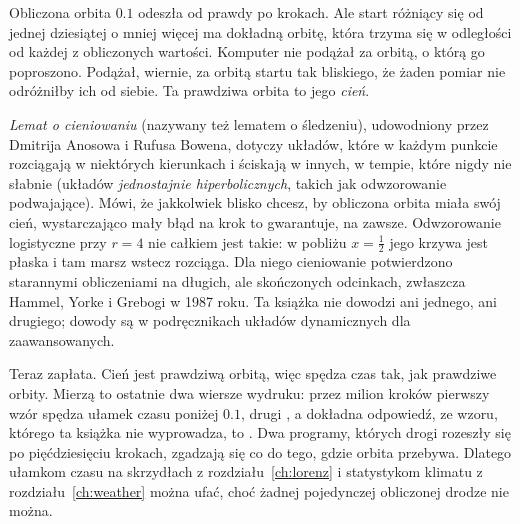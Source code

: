 

\noindent
Obliczona orbita $\num{0.1}$ odeszła od prawdy po 
krokach. Ale start różniący się od jednej dziesiątej o mniej więcej
 ma dokładną orbitę, która trzyma się w odległości
 od każdej z  obliczonych
wartości. Komputer nie podążał za orbitą, o którą go poproszono. Podążał,
wiernie, za orbitą startu tak bliskiego, że żaden pomiar nie odróżniłby ich
od siebie. Ta prawdziwa orbita to jego \emph{cień}.

\begin{rigourbox}
\emph{Lemat o cieniowaniu} (nazywany też lematem o śledzeniu), udowodniony
przez Dmitrija Anosowa i Rufusa Bowena, dotyczy układów, które w każdym punkcie rozciągają w niektórych
kierunkach i ściskają w innych, w tempie, które nigdy nie słabnie (układów
\emph{jednostajnie hiperbolicznych}, takich jak odwzorowanie podwajające).
Mówi, że jakkolwiek blisko chcesz, by obliczona orbita miała swój cień,
wystarczająco mały błąd na krok to gwarantuje, na zawsze. Odwzorowanie
logistyczne przy $r = 4$ nie całkiem jest takie: w pobliżu $x = \tfrac{1}{2}$
jego krzywa jest płaska i tam marsz wstecz rozciąga. Dla niego cieniowanie
potwierdzono starannymi obliczeniami na długich, ale skończonych odcinkach,
zwłaszcza Hammel, Yorke i Grebogi w 1987 roku. Ta książka nie dowodzi ani
jednego, ani drugiego; dowody są w podręcznikach układów dynamicznych dla
zaawansowanych.
\end{rigourbox}

\noindent
Teraz zapłata. Cień jest prawdziwą orbitą, więc spędza czas tak, jak
prawdziwe orbity. Mierzą to ostatnie dwa wiersze wydruku: przez milion
kroków pierwszy wzór spędza ułamek  czasu poniżej
$\num{0.1}$, drugi , a dokładna odpowiedź, ze wzoru,
którego ta książka nie wyprowadza, to . Dwa programy, których drogi rozeszły
się po pięćdziesięciu krokach, zgadzają się co do tego, gdzie orbita
przebywa. Dlatego ułamkom czasu na skrzydłach z rozdziału~\ref{ch:lorenz} i
statystykom klimatu z rozdziału~\ref{ch:weather} można ufać, choć żadnej
pojedynczej obliczonej drodze nie można.


